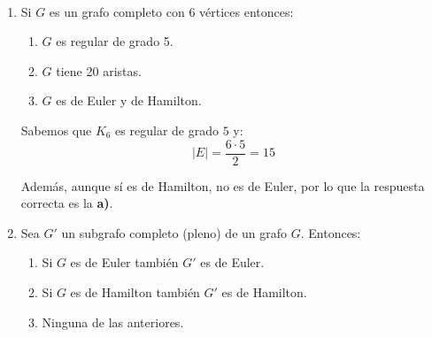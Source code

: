 \begin{ejercicio}\label{ej:1.27}~
    \begin{enumerate}
        \item Si $G$ es un grafo completo con 6 vértices entonces:
        \begin{enumerate}
            \item $G$ es regular de grado 5.
            \item $G$ tiene 20 aristas.
            \item $G$ es de Euler y de Hamilton.
        \end{enumerate}

        Sabemos que $K_6$ es regular de grado $5$ y:
        \begin{equation*}
            |E|=\dfrac{6\cdot 5}{2} = 15
        \end{equation*}

        Además, aunque sí es de Hamilton, no es de Euler, por lo que la respuesta correcta es la \textbf{a)}.
        \item\label{ej:1.27_2}
        Sea $G'$ un subgrafo completo (pleno) de un grafo $G$. Entonces:
        \begin{enumerate}
            \item Si $G$ es de Euler también $G'$ es de Euler.
            \item Si $G$ es de Hamilton también $G'$ es de Hamilton.
            \item Ninguna de las anteriores.
        \end{enumerate}

        \begin{figure}
            \centering
            \begin{subfigure}{0.45\textwidth}
                \centering
\end{subfigure}
\end{figure}
\end{enumerate}
\end{ejercicio}
